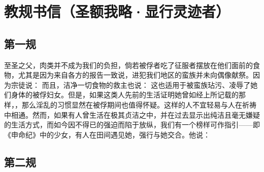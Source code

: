 
\chapter{教规书信（圣额我略·显行灵迹者）}



\section{第一规}

至圣之父，肉类并不成为我们的负担，倘若被俘者吃了征服者摆放在他们面前的食物，尤其是因为来自各方的报告一致说，进犯我们地区的蛮族并未向偶像献祭。因为宗徒说： 而且，洁净一切食物的救主也说： 这也适用于被蛮族玷污、凌辱了她们身体的被俘妇女。但是，如果这类人先前的生活证明她曾如经上所记载的那样，，那么淫乱的习惯显然在被俘期间也值得怀疑。这样的人不宜轻易与人在祈祷中相通。然而，如果有人曾生活在极其贞洁之中，并在过去显示出纯洁且毫无嫌疑的生活方式，而如今因不得已的强迫而陷于放纵，我们有一个榜样可作指引——即《申命纪》中的少女，有人在田间遇见她，强行与她交合。他说：\par


\section{第二规}

